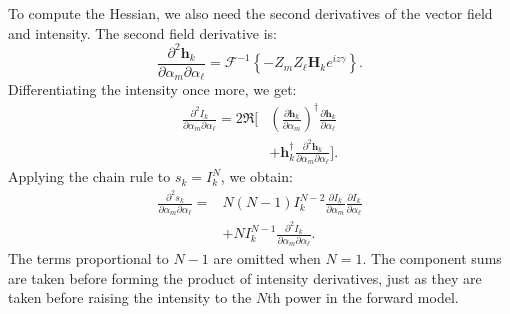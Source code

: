 \documentclass{article}
\begin{document}
To compute the Hessian, we also need the second derivatives of the vector field and intensity. The second field derivative is:
\begin{equation}
\frac{\partial^2\mathbf h_k}{\partial\alpha_m\partial\alpha_\ell}
=\mathcal F^{-1}\left\{-Z_mZ_\ell\mathbf H_k e^{iz\gamma}\right\}.
\end{equation}
Differentiating the intensity once more, we get:
\begin{equation}
\begin{aligned}
\frac{\partial^2 I_k}{\partial\alpha_m\partial\alpha_\ell}
=2\Re\Bigg[&
\left(\frac{\partial\mathbf h_k}{\partial\alpha_m}\right)^\dagger
\frac{\partial\mathbf h_k}{\partial\alpha_\ell} \\
&+\mathbf h_k^\dagger
\frac{\partial^2\mathbf h_k}{\partial\alpha_m\partial\alpha_\ell}
\Bigg].
\end{aligned}
\end{equation}
Applying the chain rule to $s_k=I_k^N$, we obtain:
\begin{equation}
\begin{aligned}
\frac{\partial^2s_k}{\partial\alpha_m\partial\alpha_\ell}
={}&N(N-1)I_k^{N-2}
\frac{\partial I_k}{\partial\alpha_m}
\frac{\partial I_k}{\partial\alpha_\ell} \\
&+NI_k^{N-1}
\frac{\partial^2I_k}{\partial\alpha_m\partial\alpha_\ell}.
\end{aligned}
\end{equation}
The terms proportional to $N-1$ are omitted when $N=1$. The component sums are taken before forming the product of intensity derivatives, just as they are taken before raising the intensity to the $N$th power in the forward model.
\end{document}
